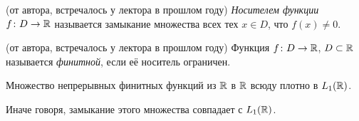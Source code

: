 \begin{definition} (от автора, встречалось у лектора в прошлом году)
	\textit{Носителем функции} $f \colon D \to \mathbb{R}$ называется замыкание множества всех тех $x \in D$, что $f(x) \neq 0$.
\end{definition}

\begin{definition} (от автора, встречалось у лектора в прошлом году)
	Функция $f \colon D \to \mathbb{R}$, $D \subset \mathbb{R}$ называется \textit{финитной}, если её носитель ограничен.
\end{definition}

\begin{lemma}
	Множество непрерывных финитных функций из $\mathbb{R}$ в $\mathbb{R}$ всюду плотно в $L_1(\mathbb{R})$.
\end{lemma}

\begin{note}
	Иначе говоря, замыкание этого множества совпадает с $L_1(\mathbb{R})$.
\end{note}

